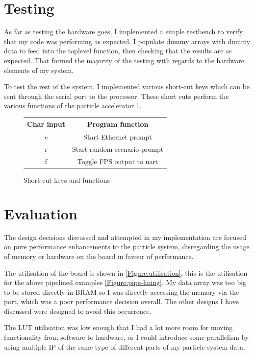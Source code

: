 \documentclass[12pt]{article} %
\begin{document}
\section{Testing}

As far as testing the hardware goes, I implemented a simple testbench to verify that my code was performing as expected. I populate dummy arrays with dummy data to feed into the toplevel function, then checking that the results are as expected. That formed the majority of the testing with regards to the hardware elements of my system.

To test the rest of the system, I implemented various short-cut keys which can be sent through the serial port to the processor. These short cuts perform the various functions of the particle accelerator \cref{Table:short-cuts}.

\begin{figure}[h!]
\begin{center}
\begin{tabular}{ |c|c| } 
 \hline
Char input & Program function \\
 \hline\hline
 e & Start Ethernet prompt \\ 
 \hline
 r & Start random scenario prompt \\ 
 \hline
 f & Toggle FPS output to uart \\ 
 \hline
\end{tabular}
\end{center}
	\caption{Short-cut keys and functions}
  \label{Table:short-cuts}
\end{figure}

\section{Evaluation}

The design decisions discussed and attempted in my implementation are focused on pure performance enhancements to the particle system, disregarding the usage of memory or hardware on the board in favour of performance.

The utilisation of the board is shown in \cref{Figure:utilisation}, this is the utilisation for the above pipelined examples \cref{Figure:pipe-lining}. My data array was too big to be stored directly in BRAM so I was directly accessing the memory via the port, which was a poor performance decision overall. The other designs I have discussed were designed to avoid this occurrence.

The LUT utilisation was low enough that I had a lot more room for moving functionality from software to hardware, or I could introduce some parallelism by using multiple IP of the same type of different parts of my particle system data.
\end{document}
